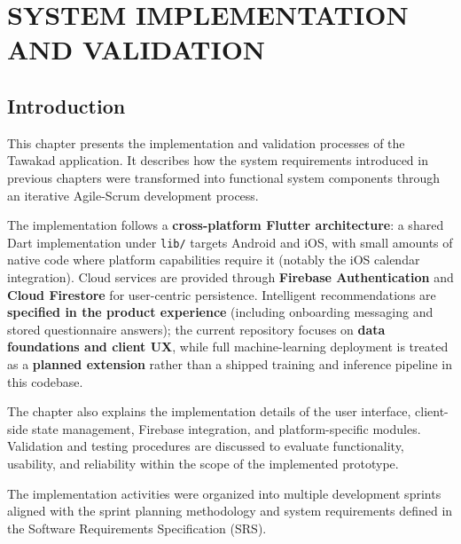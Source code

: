 
\chapter{SYSTEM IMPLEMENTATION AND VALIDATION}

\section{Introduction}

This chapter presents the implementation and validation processes of the Tawakad
application. It describes how the system requirements introduced in previous chapters
were transformed into functional system components through an iterative Agile-Scrum
development process.

\vspace{0.3cm}

The implementation follows a \textbf{cross-platform Flutter architecture}: a shared
Dart implementation under \texttt{lib/} targets Android and iOS, with small amounts
of native code where platform capabilities require it (notably the iOS calendar
integration). Cloud services are provided through \textbf{Firebase Authentication} and
\textbf{Cloud Firestore} for user-centric persistence. Intelligent recommendations are
\textbf{specified in the product experience} (including onboarding messaging and
stored questionnaire answers); the current repository focuses on \textbf{data
foundations and client UX}, while full machine-learning deployment is treated as a
\textbf{planned extension} rather than a shipped training and inference pipeline in
this codebase.

\vspace{0.3cm}

The chapter also explains the implementation details of the user interface, client-side
state management, Firebase integration, and platform-specific modules. Validation and
testing procedures are discussed to evaluate functionality, usability, and reliability
within the scope of the implemented prototype.

\vspace{0.3cm}

The implementation activities were organized into multiple development sprints aligned
with the sprint planning methodology and system requirements defined in the Software
Requirements Specification (SRS).

